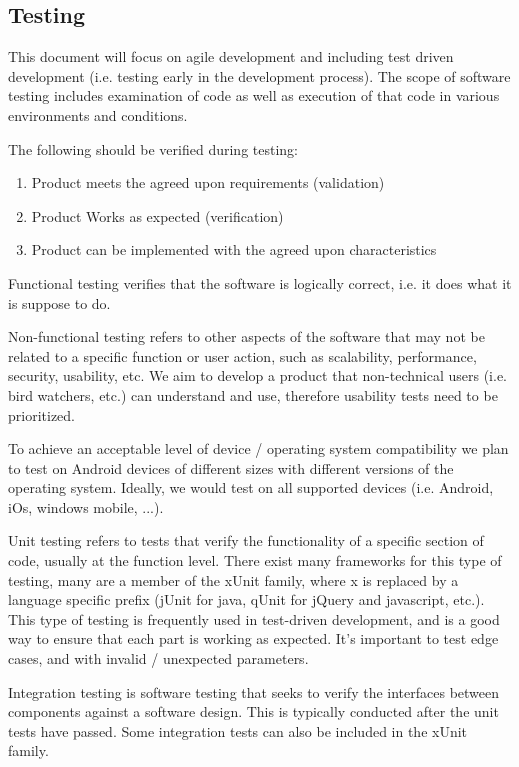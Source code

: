 
\subsection{Testing}

This document will focus on agile development and including test driven
development (i.e. testing early in the development process).  The scope of
software testing includes examination of code as well as execution of that code
in various environments and conditions.

The following should be verified during testing: \cite{wiki:software-testing}
\begin{enumerate}
	\item Product meets the agreed upon requirements (validation)
	\item Product Works as expected (verification)
	\item Product can be implemented with the agreed upon characteristics
\end{enumerate}

Functional testing verifies that the software is logically correct,
i.e. it does what it is suppose to do.

Non-functional testing refers to other aspects of the software that may not be
related to a specific function or user action, such as scalability,
performance, security, usability, etc.  We aim to develop a product that
non-technical users (i.e.  bird watchers, etc.) can understand and use,
therefore usability tests need to be prioritized.

To achieve an acceptable level of device / operating system compatibility we
plan to test on Android devices of different sizes with different versions of
the operating system.  Ideally, we would test on all supported devices (i.e.
Android, iOs, windows mobile, ...).

Unit testing refers to tests that verify the functionality of a specific
section of code, usually at the function level. There exist many frameworks for
this type of testing, many are a member of the xUnit family, where x is
replaced by a language specific prefix (jUnit for java, qUnit for jQuery and
javascript, etc.).  This type of testing is frequently used in test-driven
development, and is a good way to ensure that each part is working as expected.
It's important to test edge cases, and with invalid / unexpected parameters.

Integration testing is software testing that seeks to verify the interfaces
between components against a software design. This is typically conducted after
the unit tests have passed. Some integration tests can also be included in the
xUnit family.


